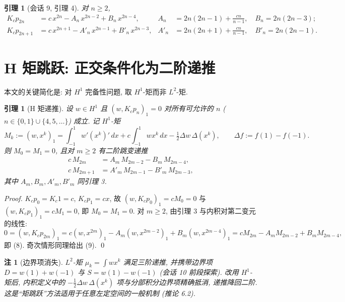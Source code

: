 \documentclass[UTF8]{ctexart}
\newtheorem{lemma}[theorem]{引理}
\newtheorem{remark}[theorem]{注}
\begin{document}
\begin{lemma}[会话 9, 引理 4]
对 $n \geq 2$,
\begin{align}
	K_c p_{2n} &= c\, x^{2n} - A_n\, x^{2n-2} + B_n\, x^{2n-4},
	& A_n &= 2n(2n-1) + \frac{cn}{n-1}, \quad B_n = 2n(2n-3); \\
	K_c p_{2n+1} &= c\, x^{2n+1} - A'_n\, x^{2n-1} + B'_n\, x^{2n-3},
	& A'_n &= 2n(2n+1) + \frac{cn}{n-1}, \quad B'_n = 2n(2n-1).
\end{align}
\end{lemma}

\section{H 矩跳跃: 正交条件化为二阶递推}

本文的关键简化是: 对 $H^1$ 完备性问题, 取 $H^1$-矩而非 $L^2$-矩.

\begin{lemma}[H 矩递推]
设 $w \in H^1$ 且 $(w, K_c p_n)_1 = 0$ 对所有可允许的 $n$
($n \in \{0,1\} \cup \{4,5,\dots\}$) 成立. 记 $H^1$-矩
\begin{equation}
	M_k := (w, x^k)_1 = \int_{-1}^{1} w'(x^k)'\, dx + c \int_{-1}^{1} w x^k\, dx
		- \tfrac12 \Delta w\, \Delta(x^k),
	\qquad \Delta f := f(1) - f(-1).
\end{equation}
则 $M_0 = M_1 = 0$, 且对 $m \geq 2$ 有\emph{二阶}跳变递推
\begin{align}
	c\, M_{2m} &= A_m\, M_{2m-2} - B_m\, M_{2m-4}, \\
	c\, M_{2m+1} &= A'_m\, M_{2m-1} - B'_m\, M_{2m-3},
\end{align}
其中 $A_m, B_m, A'_m, B'_m$ 同引理 3.
\end{lemma}

\begin{proof}
$K_c p_0 = K_c 1 = c$, $K_c p_1 = c x$, 故
$(w, K_c p_0)_1 = c M_0 = 0$ 与 $(w, K_c p_1)_1 = c M_1 = 0$, 即 $M_0 = M_1 = 0$.
对 $m \geq 2$, 由引理 3 与内积对第二变元的线性:
\[
	0 = (w, K_c p_{2m})_1 = c (w, x^{2m})_1 - A_m (w, x^{2m-2})_1
		+ B_m (w, x^{2m-4})_1 = c M_{2m} - A_m M_{2m-2} + B_m M_{2m-4},
\]
即 (8). 奇次情形同理给出 (9). \qed
\end{proof}

\begin{remark}[边界项消失]
$L^2$-矩 $\mu_k = \int w x^k$ 满足三阶递推, 并携带边界项
$D = w(1)+w(-1)$ 与 $S = w(1)-w(-1)$ (会话 10 前段探索). 改用 $H^1$-矩后,
内积定义中的 $- \tfrac12 \Delta w\, \Delta(x^k)$ 项与分部积分边界项精确抵消,
递推降回二阶. 这是``矩跳跃''方法适用于任意左定空间的一般机制 (推论 6.2).
\end{remark}
\end{document}
